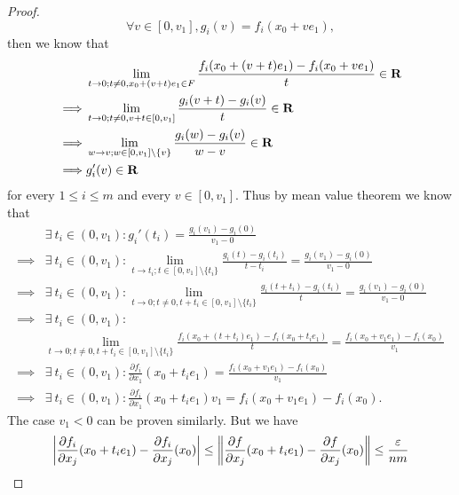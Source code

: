 \begin{proof}
    \[
        \forall v \in [0, v_1], g_i(v) = f_i(x_0 + v e_1),
    \]
    then we know that
    \begin{align*}
                 & \lim_{t \to 0 ; t \neq 0, x_0 + (v + t) e_1 \in F} \frac{f_i(x_0 + (v + t) e_1) - f_i(x_0 + v e_1)}{t} \in \R \\
        \implies & \lim_{t \to 0 ; t \neq 0, v + t \in [0, v_1]} \frac{g_i(v + t) - g_i(v)}{t} \in \R                            \\
        \implies & \lim_{w \to v ; w \in [0, v_1] \setminus \{v\}} \frac{g_i(w) - g_i(v)}{w - v} \in \R                          \\
        \implies & g_i'(v) \in \R
    \end{align*}
    for every \(1 \leq i \leq m\) and every \(v \in [0, v_1]\).
    Thus by mean value theorem we know that
    \begin{align*}
                 & \exists\ t_i \in (0, v_1) : g_i'(t_i) = \frac{g_i(v_1) - g_i(0)}{v_1 - 0}                                                                                            \\
        \implies & \exists\ t_i \in (0, v_1) : \lim_{t \to t_i; t \in [0, v_1] \setminus \{t_i\}} \frac{g_i(t) - g_i(t_i)}{t - t_i} = \frac{g_i(v_1) - g_i(0)}{v_1 - 0}                 \\
        \implies & \exists\ t_i \in (0, v_1) : \lim_{t \to 0; t \neq 0, t + t_i \in [0, v_1] \setminus \{t_i\}} \frac{g_i(t + t_i) - g_i(t_i)}{t} = \frac{g_i(v_1) - g_i(0)}{v_1 - 0}   \\
        \implies & \exists\ t_i \in (0, v_1) :                                                                                                                                          \\
                 & \lim_{t \to 0; t \neq 0, t + t_i \in [0, v_1] \setminus \{t_i\}} \frac{f_i(x_0 + (t + t_i) e_1) - f_i(x_0 + t_i e_1)}{t} = \frac{f_i(x_0 + v_1 e_1) - f_i(x_0)}{v_1} \\
        \implies & \exists\ t_i \in (0, v_1) : \frac{\partial f_i}{\partial x_1}(x_0 + t_i e_1) = \frac{f_i(x_0 + v_1 e_1) - f_i(x_0)}{v_1}                                             \\
        \implies & \exists\ t_i \in (0, v_1) : \frac{\partial f_i}{\partial x_1}(x_0 + t_i e_1) v_1 = f_i(x_0 + v_1 e_1) - f_i(x_0).
    \end{align*}
    The case \(v_1 < 0\) can be proven similarly.
    But we have
    \[
        \abs{\frac{\partial f_i}{\partial x_j}(x_0 + t_i e_1) - \frac{\partial f_i}{\partial x_j}(x_0)} \leq \norm*{\frac{\partial f}{\partial x_j}(x_0 + t_i e_1) - \frac{\partial f}{\partial x_j}(x_0)} \leq \frac{\varepsilon}{nm}
\]
\end{proof}
